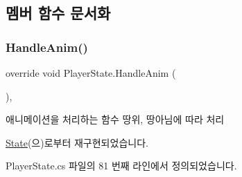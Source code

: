 \subsection{멤버 함수 문서화}
\mbox{\label{class_player_state_ae57c0c11c946d701bb1e0eb2bc7204dd}} 
\subsubsection{\texorpdfstring{HandleAnim()}{HandleAnim()}}
{\footnotesize\ttfamily override void Player\+State.\+Handle\+Anim (\begin{DoxyParamCaption}{ }\end{DoxyParamCaption})\hspace{0.3cm}{\ttfamily [protected]}, {\ttfamily [virtual]}}



애니메이션을 처리하는 함수\textquotesingle{} 땅위, 땅아님에 따라 처리 



\mbox{\hyperlink{class_state_aa064ec6cd84d4a09b2c72a536125c74b}{State}}(으)로부터 재구현되었습니다.



Player\+State.\+cs 파일의 81 번째 라인에서 정의되었습니다.


